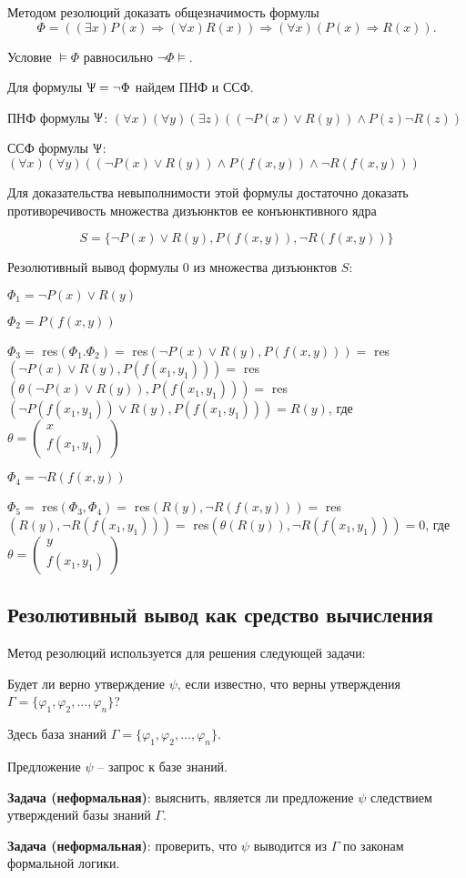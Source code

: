 \begin{example}
    Методом резолюций доказать общезначимость формулы
    $$\Phi = ((\exists x)P(x)\Rightarrow(\forall x)R(x))\Rightarrow (\forall x)(P(x)\Rightarrow R(x)).$$

    Условие $\models\Phi$ равносильно $\lnot\Phi\models$.

    Для формулы $\Uppsi = \lnot\Phi$ найдем ПНФ и ССФ.

    ПНФ формулы $\Uppsi$: \quad
    $(\forall x)(\forall y)(\exists z)((\lnot P(x)\lor R(y))\land P(z)\lnot R(z))$

    ССФ формулы $\Uppsi$: \quad
    $(\forall x)(\forall y)((\lnot P(x)\lor R(y))\land P(f(x,y))\land\lnot R(f(x,y)))$

    Для доказательства невыполнимости этой формулы достаточно доказать противоречивость множества дизъюнктов ее конъюнктивного ядра

    $$S = \{\lnot P(x)\lor R(y), P(f(x,y)), \lnot R(f(x,y))\}$$

    Резолютивный вывод формулы 0 из множества дизъюнктов $S$:

    $\Phi_1 = \lnot P(x)\lor R(y)$

    $\Phi_2 = P(f(x,y))$

    $\Phi_3 = $ res$(\Phi_1.\Phi_2) =$ res$(\lnot P(x)\lor R(y), P(f(x,y)))=$ res$(\lnot P(x)\lor R(y), P(f(x_1,y_1))) = $ res$(\theta(\lnot P(x)\lor R(y)), P(f(x_1,y_1))) =$ res$(\lnot P(f(x_1,y_1))\lor R(y), P(f(x_1,y_1))) = R(y)$, где $\theta = \begin{pmatrix}
        x \\ f(x_1,y_1)
    \end{pmatrix}$

    $\Phi_4 = \lnot R(f(x,y))$

    $\Phi_5 =$ res$(\Phi_3,\Phi_4) =$ res$(R(y),\lnot R(f(x,y))) =$ res$(R(y),\lnot R(f(x_1,y_1))) = $ res$(\theta(R(y)),\lnot R(f(x_1,y_1))) = 0$, где $\theta = \begin{pmatrix}
        y \\ f(x_1,y_1)
    \end{pmatrix}$
\end{example}

\subsection*{Резолютивный вывод как средство вычисления}
Метод резолюций используется для решения следующей задачи:

Будет ли верно утверждение $\psi$, если известно, что верны утверждения $\Gamma = \{\varphi_1,\varphi_2,\ldots,\varphi_n\}$?

Здесь база знаний $\Gamma = \{\varphi_1,\varphi_2,\ldots,\varphi_n\}$.

Предложение $\psi$ -- запрос к базе знаний.

\textbf{Задача (неформальная)}: выяснить, является ли предложение $\psi$ следствием утверждений базы знаний $\Gamma$.

\textbf{Задача (неформальная)}: проверить, что $\psi$ выводится из $\Gamma$ по законам формальной логики.